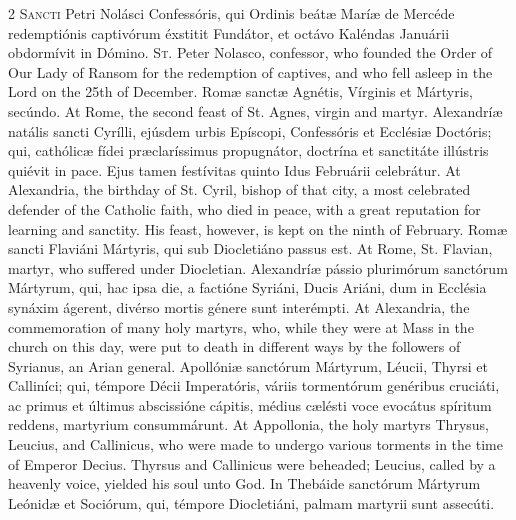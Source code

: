 \begin{paracol}{2}
\lettrine[lines=2]{S}{ancti} Petri Nolásci Confessóris, qui Ordinis beátæ 
 Maríæ de Mercéde redemptiónis captivórum éxstitit Fundátor, et octávo Kaléndas Januárii obdormívit in Dómino.
\switchcolumn
{}
\lettrine[lines=2]{S}{t.} Peter Nolasco, confessor, who founded the Order of Our Lady of Ransom 
 for the redemption of captives, and who fell asleep in the Lord on the 25th 
 of December.
\switchcolumn*
{}
Romæ sanctæ Agnétis, Vírginis et Mártyris, 
 secúndo.
\switchcolumn
{}
At Rome, the second feast of St. Agnes, virgin and martyr.
\switchcolumn*
{}
Alexandríæ natális sancti Cyrílli, ejúsdem 
 urbis Epíscopi, Confessóris et Ecclésiæ Doctóris; qui, cathólicæ fídei 
 præclaríssimus propugnátor, doctrína et sanctitáte illústris quiévit in 
 pace. Ejus tamen festívitas quinto Idus Februárii celebrátur.
\switchcolumn
{}
At Alexandria, the birthday of St. Cyril, bishop of that city, a most 
 celebrated defender of the Catholic faith, who died in peace, with a great 
 reputation for learning and sanctity. His feast, however, is kept on 
 the ninth of February.
\switchcolumn*
{}
Romæ sancti Flaviáni Mártyris, qui sub 
 Diocletiáno passus est.
\switchcolumn
{}
At Rome, St. Flavian, martyr, who suffered under Diocletian.
\switchcolumn*
{}
Alexandríæ pássio plurimórum sanctórum Mártyrum, 
 qui, hac ipsa die, a factióne Syriáni, Ducis Ariáni, dum in Ecclésia synáxim 
 ágerent, divérso mortis génere sunt interémpti.
\switchcolumn
{}
At Alexandria, the commemoration of many holy martyrs, who, while they were 
 at Mass in the church on this day, were put to death in different ways by 
 the followers of Syrianus, an Arian general.
\switchcolumn*
{}
Apollóniæ sanctórum Mártyrum, Léucii, Thyrsi et 
 Calliníci; qui, témpore Décii Imperatóris, váriis tormentórum genéribus 
 cruciáti, ac primus et últimus abscissióne cápitis, médius cælésti voce 
 evocátus spíritum reddens, martyrium consummárunt.
\switchcolumn
{}
At Appollonia, the holy martyrs Thrysus, Leucius, and Callinicus, who were 
 made to undergo various torments in the time of Emperor Decius. 
 Thyrsus and Callinicus were beheaded; Leucius, called by a heavenly voice, 
 yielded his soul unto God.
\switchcolumn*
{}
In Thebáide sanctórum Mártyrum Leónidæ et 
 Sociórum, qui, témpore Diocletiáni, palmam martyrii sunt assecúti.

\end{paracol}
